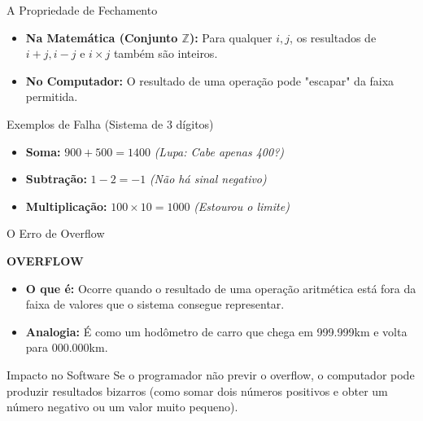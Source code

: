 \begin{frame}{A Propriedade de Fechamento}
    \begin{itemize}
        \item \textbf{Na Matemática (Conjunto $\mathbb{Z}$):} Para qualquer $i, j$, os resultados de $i+j, i-j$ e $i \times j$ também são inteiros.
        \item \textbf{No Computador:} O resultado de uma operação pode "escapar" da faixa permitida.
    \end{itemize}

    \begin{exampleblock}{Exemplos de Falha (Sistema de 3 dígitos)}
        \begin{itemize}
            \item \textbf{Soma:} $900 + 500 = 1400$ \hfill \textit{(Lupa: Cabe apenas 400?)}
            \item \textbf{Subtração:} $1 - 2 = -1$ \hfill \textit{(Não há sinal negativo)}
            \item \textbf{Multiplicação:} $100 \times 10 = 1000$ \hfill \textit{(Estourou o limite)}
        \end{itemize}
    \end{exampleblock}
\end{frame}

\begin{frame}{O Erro de Overflow}
    \begin{center}
        \Large \color{red} \textbf{OVERFLOW}
    \end{center}

    \begin{itemize}
        \item \textbf{O que é:} Ocorre quando o resultado de uma operação aritmética está fora da faixa de valores que o sistema consegue representar.
        \item \textbf{Analogia:} É como um hodômetro de carro que chega em 999.999km e volta para 000.000km.
    \end{itemize}

    \begin{block}{Impacto no Software}
        Se o programador não previr o overflow, o computador pode produzir resultados bizarros (como somar dois números positivos e obter um número negativo ou um valor muito pequeno).
    \end{block}
\end{frame}

